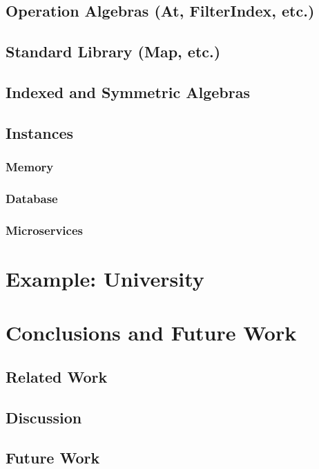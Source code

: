 \documentclass[a4paper]{report}
\begin{document}
\section{Operation Algebras (At, FilterIndex, etc.)}
\section{Standard Library (Map, etc.)}
\section{Indexed and Symmetric Algebras}
\section{Instances}
\subsection{Memory}
\subsection{Database}
\subsection{Microservices}

\chapter{Example: University}

\chapter{Conclusions and Future Work}
\section{Related Work}
\section{Discussion}
\section{Future Work}
\end{document}

